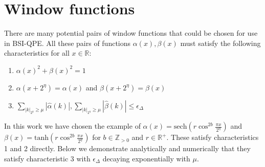 \documentclass[aps,floatfix,10pt,amssymb,amsfont,amsmath,superscriptaddress,float,nofootinbib,longbibliography,nobalancelastpage,twocolumn]{revtex4-2}
\begin{document}
\section{Window functions}
\label{section:appendix}
There are many potential pairs of window functions that could be chosen for use in BSI-QPE. All these pairs of functions $\alpha(x), \beta(x)$ must satisfy the following characteristics for all $x \in \mathbb{R}$:
\begin{enumerate}
    \item $\alpha(x)^2+\beta(x)^2 =1$
    \item $\alpha(x+2^{\eta}) = \alpha(x)$ and $\beta(x+2^{\eta}) = \beta(x)$
    \item $\sum_{|k|_{2^{\eta}}\geq\mu}|\hat \alpha(k)|, \sum_{|k|_{2^{\eta}}\geq\mu}|\hat \beta(k)| \leq \epsilon_\Delta$
\end{enumerate}
In this work we have chosen the example of $\alpha(x) = \text{sech}( r\cos^{2b} \frac{\pi x}{2^{\eta}})$ and $\beta(x) = \text{tanh}(r \cos^{2b} \frac{\pi x}{2^{\eta}})$ for $b \in \mathbb{Z}_{>0}$ and $r \in \mathbb{R}^+$. These satisfy characteristics 1 and 2 directly. Below we demonstrate analytically and numerically that they satisfy characteristic 3 with $\epsilon_{\Delta}$ decaying exponentially with $\mu$.
\end{document}
